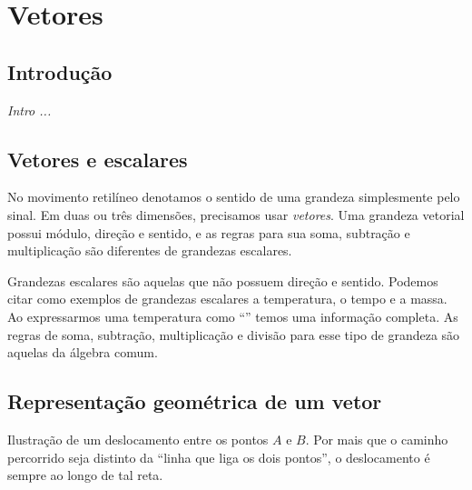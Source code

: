 \chapter{Vetores}
\label{Chap:Vetores}


\section{Introdução}

{\it
Intro ...
}

\section{Vetores e escalares}

No movimento retilíneo denotamos o sentido de uma grandeza simplesmente pelo sinal. Em duas ou três dimensões, precisamos usar \emph{vetores}. Uma grandeza vetorial possui módulo, direção e sentido, e as regras para sua soma, subtração e multiplicação são diferentes de grandezas escalares.

Grandezas escalares são aquelas que não possuem direção e sentido. Podemos citar como exemplos de grandezas escalares a temperatura, o tempo e a massa. Ao expressarmos uma temperatura como ``'' temos uma informação completa. As regras de soma, subtração, multiplicação e divisão para esse tipo de grandeza são aquelas da álgebra comum.

\section{Representação geométrica de um vetor}

\begin{marginfigure}
\centering
{}
\caption{Ilustração de um deslocamento entre os pontos $A$ e $B$. Por mais que o caminho percorrido seja distinto da ``linha que liga os dois pontos'', o deslocamento é sempre ao longo de tal reta.}
\end{marginfigure}

